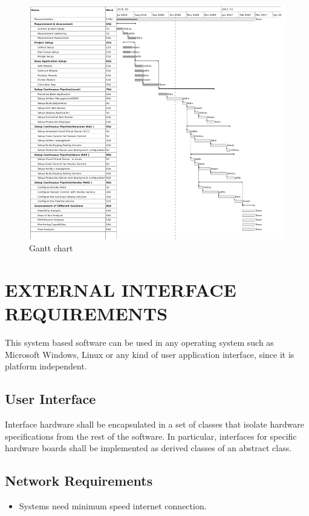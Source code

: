 \documentclass[12pt,a4paper,oneside]{report}
\begin{document}
{\begin{figure}[h]
\begin{center}
\includegraphics[scale=1.1]{gnt.png}
\caption{Gantt chart}
\label{Gantt chart}
\end{center}
\end{figure}
\newpage


\par
\section{EXTERNAL INTERFACE REQUIREMENTS}
This system based software can be used in any operating system such as Microsoft Windows, Linux or any kind of user application interface, since it is platform independent.

\subsection{User Interface}
Interface hardware shall be encapsulated in a set of classes that isolate hardware specifications from the rest of the software. In particular, interfaces for specific hardware boards shall be implemented as derived classes of an abstract class.
\\

\subsection{Network Requirements}  
\begin{itemize}
\item Systems need minimum speed internet connection.
\end{itemize}
}
\end{document}

